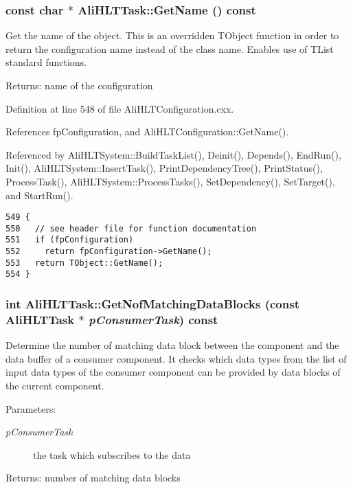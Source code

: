 \subsubsection{\setlength{\rightskip}{0pt plus 5cm}const char $\ast$ Ali\-HLTTask::Get\-Name () const}\label{classAliHLTTask_a7}


Get the name of the object. This is an overridden TObject function in order to return the configuration name instead of the class name. Enables use of TList standard functions. \begin{Desc}
\item[Returns:]name of the configuration \end{Desc}


Definition at line 548 of file Ali\-HLTConfiguration.cxx.

References fp\-Configuration, and Ali\-HLTConfiguration::Get\-Name().

Referenced by Ali\-HLTSystem::Build\-Task\-List(), Deinit(), Depends(), End\-Run(), Init(), Ali\-HLTSystem::Insert\-Task(), Print\-Dependency\-Tree(), Print\-Status(), Process\-Task(), Ali\-HLTSystem::Process\-Tasks(), Set\-Dependency(), Set\-Target(), and Start\-Run().

\footnotesize\begin{verbatim}549 {
550   // see header file for function documentation
551   if (fpConfiguration)
552     return fpConfiguration->GetName();
553   return TObject::GetName();
554 }
\end{verbatim}\normalsize 


\subsubsection{\setlength{\rightskip}{0pt plus 5cm}int Ali\-HLTTask::Get\-Nof\-Matching\-Data\-Blocks (const {\bf Ali\-HLTTask} $\ast$ {\em p\-Consumer\-Task}) const}\label{classAliHLTTask_a21}


Determine the number of matching data block between the component and the data buffer of a consumer component. It checks which data types from the list of input data types of the consumer component can be provided by data blocks of the current component. \begin{Desc}
\item[Parameters:]
\begin{description}
\item[{\em p\-Consumer\-Task}]the task which subscribes to the data \end{description}
\end{Desc}
\begin{Desc}
\item[Returns:]number of matching data blocks \end{Desc}


